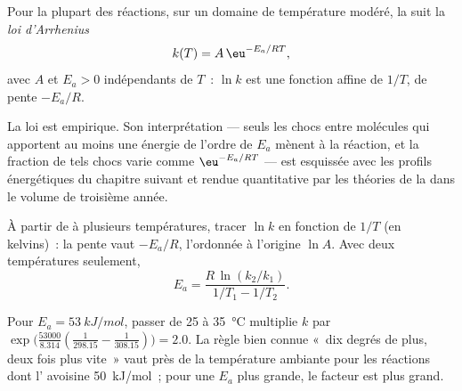 \begin{theorem}\label{thm:b1:rate-laws:arrhenius}
Pour la plupart des réactions, sur un domaine de température modéré, la
 suit la \emph{loi d'Arrhenius}
\[
  k(T) = A\,\eu^{-E_a/RT} ,
\]
avec $A$ et $E_a > 0$ indépendants de $T$~: $\ln k$ est une fonction
affine de $1/T$, de pente $-E_a/R$.
\end{theorem}
\admitted

\begin{remark}[Le sens de $E_a$]\label{rem:b1:rate-laws:meaning}
La loi est empirique. Son interprétation --- seuls les chocs entre
molécules qui apportent au moins une énergie de l'ordre de $E_a$ mènent
à la réaction, et la fraction de tels chocs varie comme $\eu^{-E_a/RT}$
--- est esquissée avec les profils énergétiques du chapitre suivant et
rendue quantitative par les théories de la  dans le
volume de troisième année.
\end{remark}

\begin{method}[Déterminer $E_a$]\label{met:b1:rate-laws:arrhenius-plot}
À partir de  à plusieurs températures, tracer
$\ln k$ en fonction de $1/T$ (en kelvins)~: la pente vaut $-E_a/R$,
l'ordonnée à l'origine $\ln A$. Avec deux températures seulement,
\[
  E_a = \frac{R\,\ln(k_2/k_1)}{1/T_1 - 1/T_2} .
\]
\end{method}

\begin{example}\label{ex:b1:rate-laws:doubling}
Pour $E_a = \qty{53}{kJ/mol}$, passer de 25 à \qty{35}{\celsius}
multiplie $k$ par $\exp\!\big(\frac{53000}{8.314}(\frac{1}{298.15} -
\frac{1}{308.15})\big) = 2.0$. La règle bien connue «~dix degrés de
plus, deux fois plus vite~» vaut près de la température ambiante pour
les réactions dont l' avoisine \qty{50}{kJ/mol}~;
pour une $E_a$ plus grande, le facteur est plus grand.
\end{example}

